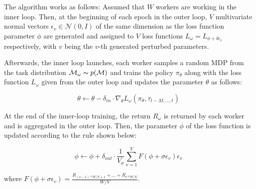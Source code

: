 \par
The algorithm works as follows: Assumed that $\textit{W}$ workers are working in the inner loop. Then, at the beginning of each epoch in the outer loop, $\textit{V}$ multivariate normal vectors $\epsilon_v \in \mathcal{N}(0,I)$ of the same dimension as the loss function parameter $\phi$ are generated and assigned to $\textit{V}$ loss functions $L_\omega = L_{\phi+\delta\epsilon_v}$ respectively, with $\textit{v}$ being the $\textit{v}$-th generated perturbed parameters.

\par
Afterwards, the inner loop launches, each worker samples a random MDP from the task distribution $\mathcal{M}_\omega\thicksim p(\mathcal{M})$ and trains the policy $\pi_\theta$ along with the loss function $L_\omega$ given from the outer loop and updates the parameter $\theta$ as follows:

\[\theta\gets\theta - \delta_{in}\cdot\nabla_\theta L_\omega(\pi_\theta,\tau_{t-M,...,t})\]

\par
At the end of the inner-loop training, the return $R_\omega$ is returned by each worker and is aggregated in the outer loop. Then, the parameter $\phi$ of the loss function is updated according to the rule shown below:

\[\phi\gets\phi+\delta_{out}\cdot\frac{1}{V_\sigma}\sum_{v=1}^{V}F(\phi+\sigma\epsilon_v)\epsilon_v\]

where $F(\phi+\sigma\epsilon_v) = \frac{R_{(v-1)*W/V+1}+...+R_{v*W/V}}{W/V}$.

